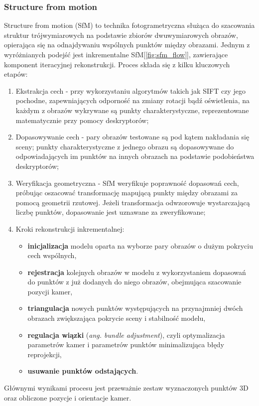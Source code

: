 \subsubsection{Structure from motion}
Structure from motion (SfM)\cite{Schonberger_2016_CVPR} to technika fotogrametryczna służąca do szacowania struktur trójwymiarowych na podstawie zbiorów dwuwymiarowych obrazów, opierająca się na odnajdywaniu wspólnych punktów między obrazami. Jednym z wyróżnianych podejść jest inkrementalne SfM[\ref{fig:sfm_flow}], zawierające komponent iteracyjnej rekonstrukcji. Proces składa się z kilku kluczowych etapów:
\begin{enumerate}
  \item Ekstrakcja cech - przy wykorzystaniu algorytmów takich jak SIFT czy jego pochodne, zapewniających odporność na zmiany rotacji bądź oświetlenia, na każdym z obrazów wykrywane są punkty charakterystyczne, reprezentowane matematycznie przy pomocy deskryptorów;
  \item Dopasowywanie cech - pary obrazów testowane są pod kątem nakładania się sceny; punkty charakterystyczne z jednego obrazu są dopasowywane do odpowiadających im punktów na innych obrazach na podstawie podobieństwa deskryptorów;
  \item Weryfikacja geometryczna - SfM weryfikuje poprawność dopasowań cech, próbując oszacować transformację mapującą punkty między obrazami za pomocą geometrii rzutowej. Jeżeli transformacja odwzorowuje wystarczającą liczbę punktów, dopasowanie jest uznawane za zweryfikowane;
  \item Kroki rekonstrukcji inkrementalnej:
    \begin{itemize}
      \item \textbf{inicjalizacja} modelu oparta na wyborze pary obrazów o dużym pokryciu cech wspólnych,
      \item \textbf{rejestracja} kolejnych obrazów w modelu z wykorzystaniem dopasowań do punktów z już dodanych do niego obrazów, obejmująca szacowanie pozycji kamer,
      \item \textbf{triangulacja} nowych punktów występujących na przynajmniej dwóch obrazach zwiększająca pokrycie sceny i stabilność modelu,
      \item \textbf{regulacja wiązki} (\textit{ang. bundle adjustment}), czyli optymalizacja parametrów kamer i parametrów punktów minimalizująca błędy reprojekcji,
      \item \textbf{usuwanie punktów odstających}.
    \end{itemize}
\end{enumerate}
Głównymi wynikami procesu jest przeważnie zestaw wyznaczonych punktów 3D oraz obliczone pozycje i orientacje kamer.

